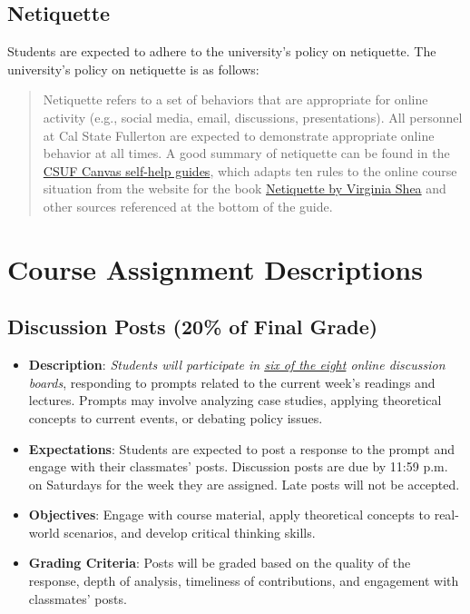 \documentclass[12pt, letterpaper]{article}
\begin{document}
\subsection*{Netiquette}
Students are expected to adhere to the university's policy on netiquette. The university's policy on netiquette is as follows:
\begin{quote}Netiquette refers to a set of behaviors that are appropriate for online activity (e.g., social media, email, discussions, presentations). All personnel at Cal State Fullerton are expected to demonstrate appropriate online behavior at all times. A good summary of netiquette can be found in the \href{https://canvashelp.fullerton.edu/m/Student/l/1336786-student-what-is-netiquette}{CSUF Canvas self-help guides}, which adapts ten rules to the online course situation from the website for the book \href{http://www.albion.com/netiquette/corerules.html}{Netiquette by Virginia Shea} and other sources referenced at the bottom of the guide.\end{quote}


\section{Course Assignment Descriptions}
\subsection*{Discussion Posts (20\% of Final Grade)} 
\begin{itemize}
    \item \textbf{Description}: \emph{Students will participate in \underline{six of the eight} online discussion boards}, responding to prompts related to the current week's readings and lectures. Prompts may involve analyzing case studies, applying theoretical concepts to current events, or debating policy issues.
    \item \textbf{Expectations}: Students are expected to post a response to the prompt and engage with their classmates' posts. Discussion posts are due by 11:59 p.m. on Saturdays for the week they are assigned. Late posts will not be accepted.
    \item \textbf{Objectives}: Engage with course material, apply theoretical concepts to real-world scenarios, and develop critical thinking skills.
    \item \textbf{Grading Criteria}: Posts will be graded based on the quality of the response, depth of analysis, timeliness of contributions, and engagement with classmates' posts.
\end{itemize}
\end{document}

